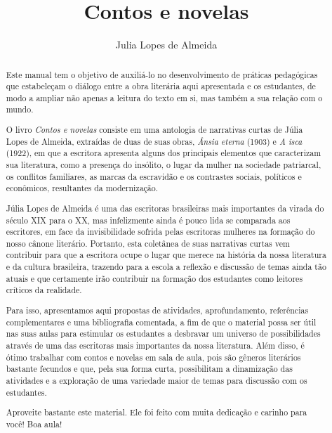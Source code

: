 \documentclass[12pt]{extarticle}
\begin{document}
\newcommand{\AutorLivro}{Julia Lopes de Almeida}
\newcommand{\TituloLivro}{Contos e novelas}
\newcommand{\Tema}{Ficção, mistério e fantasia}
\newcommand{\Genero}{Conto e novela}
\newcommand{\imagemCapa}{./images/PNLD0002-01.png}
\newcommand{\issnppub}{---}
\newcommand{\issnepub}{---}
\newcommand{\colaborador}{Rodrigo Jorge Ribeiro Neves}


\title{\TituloLivro}
\author{\AutorLivro}
\def\authornotes{\colaborador}

\date{}
\maketitle



\begin{abstract}
Este manual tem o objetivo de auxiliá-lo no desenvolvimento de práticas
pedagógicas que estabeleçam o diálogo entre a obra literária aqui
apresentada e os estudantes, de modo a ampliar não apenas a leitura do
texto em si, mas também a sua relação com o mundo.

O livro \emph{Contos e novelas} consiste em uma antologia de narrativas
curtas de Júlia Lopes de Almeida, extraídas de duas de suas obras,
\emph{Ânsia eterna} (1903) e \emph{A isca} (1922), em que a escritora
apresenta alguns dos principais elementos que caracterizam sua
literatura, como a presença do insólito, o lugar da mulher na sociedade
patriarcal, os conflitos familiares, as marcas da escravidão e os
contrastes sociais, políticos e econômicos, resultantes da modernização.

Júlia Lopes de Almeida é uma das escritoras brasileiras mais importantes
da virada do século \textsc{XIX} para o \textsc{XX}, mas infelizmente ainda é pouco lida
se comparada aos escritores, em face da invisibilidade sofrida pelas
escritoras mulheres na formação do nosso cânone literário. Portanto,
esta coletânea de suas narrativas curtas vem contribuir para que a
escritora ocupe o lugar que merece na história da nossa literatura e da
cultura brasileira, trazendo para a escola a reflexão e discussão de
temas ainda tão atuais e que certamente irão contribuir na formação dos
estudantes como leitores críticos da realidade.

Para isso, apresentamos aqui propostas de atividades, aprofundamento,
referências complementares e uma bibliografia comentada, a fim de que o
material possa ser útil nas suas aulas para estimular os estudantes a
desbravar um universo de possibilidades através de uma das escritoras
mais importantes da nossa literatura. Além disso, é ótimo trabalhar com
contos e novelas em sala de aula, pois são gêneros literários bastante
fecundos e que, pela sua forma curta, possibilitam a dinamização das
atividades e a exploração de uma variedade maior de temas para discussão
com os estudantes.

Aproveite bastante este material. Ele foi feito com muita dedicação e
carinho para você! Boa aula!
\end{abstract}
\end{document}
